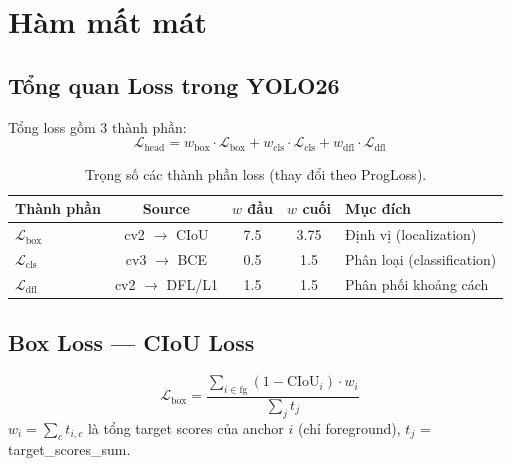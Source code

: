 \chapter{Hàm mất mát}
\label{ch:loss}

\section{Tổng quan Loss trong YOLO26}

Tổng loss gồm 3 thành phần:
\begin{equation}
    \mathcal{L}_{\text{head}} = w_{\text{box}} \cdot \mathcal{L}_{\text{box}} + w_{\text{cls}} \cdot \mathcal{L}_{\text{cls}} + w_{\text{dfl}} \cdot \mathcal{L}_{\text{dfl}}
    \label{eq:total_loss}
\end{equation}

\begin{table}[H]
\centering
\begin{tabular}{lcccl}
\toprule
\textbf{Thành phần} & \textbf{Source} & \textbf{$w$ đầu} & \textbf{$w$ cuối} & \textbf{Mục đích} \\
\midrule
$\mathcal{L}_{\text{box}}$ & cv2 $\to$ CIoU & 7.5 & 3.75 & Định vị (localization) \\
$\mathcal{L}_{\text{cls}}$ & cv3 $\to$ BCE & 0.5 & 1.5 & Phân loại (classification) \\
$\mathcal{L}_{\text{dfl}}$ & cv2 $\to$ DFL/L1 & 1.5 & 1.5 & Phân phối khoảng cách \\
\bottomrule
\end{tabular}
\caption{Trọng số các thành phần loss (thay đổi theo ProgLoss).}
\label{tab:loss_weights}
\end{table}

\section{Box Loss --- CIoU Loss}

\begin{equation}
    \mathcal{L}_{\text{box}} = \frac{\sum_{i \in \text{fg}} (1 - \text{CIoU}_i) \cdot w_i}{\sum_j t_j}
\end{equation}
$w_i = \sum_c t_{i,c}$ là tổng target scores của anchor $i$ (chỉ foreground), $t_j$ = target\_scores\_sum.


